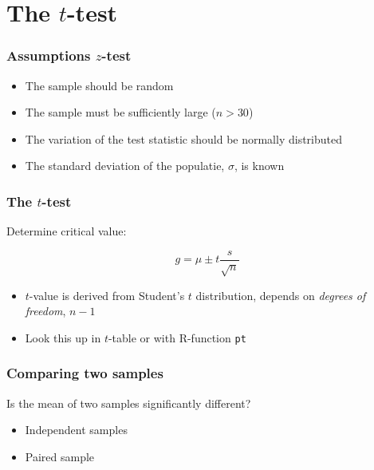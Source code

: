 \documentclass{beamer}
\begin{document}
\section{The $t$-test}
\sectionframelogo{}

\begin{frame}
  \frametitle{Assumptions $z$-test}
  
  
  \begin{itemize}
    \item The sample should be random
    \item The sample must be sufficiently large ($n > 30$)
    \item The variation of the test statistic should be normally distributed
    \item The standard deviation of the populatie, $\sigma$, is known
  \end{itemize}

\end{frame}

\begin{frame}
  \frametitle{The $t$-test}
  
  Determine critical value:
  
  \[ g = \mu \pm t \frac{s}{\sqrt{n}} \]
  
  \begin{itemize}
    \item $t$-value is derived from Student's $t$ distribution, depends on \emph{degrees of freedom}, $n-1$
    \item Look this up in $t$-table or with R-function \texttt{pt}
  \end{itemize}
  
\end{frame}

\begin{frame}
  \frametitle{Comparing two samples}
  
  Is the mean of two samples significantly different?
  
  \begin{itemize}
    \item Independent samples
    \item Paired sample
  \end{itemize}
\end{frame}
\end{document}
